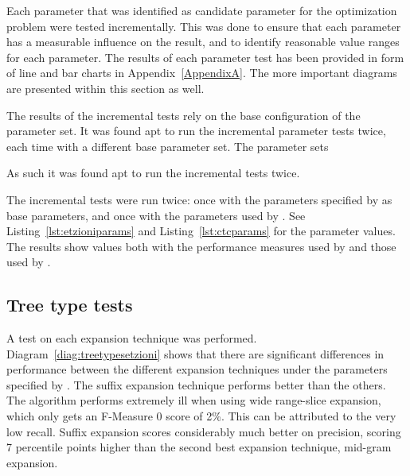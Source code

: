 Each parameter that was identified as candidate parameter for the optimization problem were tested incrementally. This was done to ensure that each parameter has a measurable influence on the result, and to identify reasonable value ranges for each parameter. The results of each parameter test has been provided in form of line and bar charts in Appendix~\ref{AppendixA}. The more important diagrams are presented within this section as well.


The results of the incremental tests rely on the base configuration of the parameter set. It was found apt to run the incremental parameter tests twice, each time with a different base parameter set. The parameter sets

As such it was found apt to run the incremental tests twice.

The incremental tests were run twice: once with the parameters specified by \citeauthor{Oren1998} as base parameters, and once with the parameters used by \cite{Moe2013}. See Listing~\ref{lst:etzioniparams} and Listing~\ref{lst:ctcparams} for the parameter values. The results show values both with the performance measures used by \citeauthor{Moe2013} and those used by \citeauthor{Oren1998}.

\subsection{Tree type tests}
A test on each expansion technique was performed. Diagram~\ref{diag:treetypesetzioni} shows that there are significant differences in performance between the different expansion techniques under the parameters specified by \citeauthor{Oren1998}. The suffix expansion technique performs better than the others. The algorithm performs extremely ill when using wide range-slice expansion, which only gets an F-Measure 0 score of 2\%. This can be attributed to the very low recall. Suffix expansion scores considerably much better on precision, scoring 7 percentile points higher than the second best expansion technique, mid-gram expansion.

